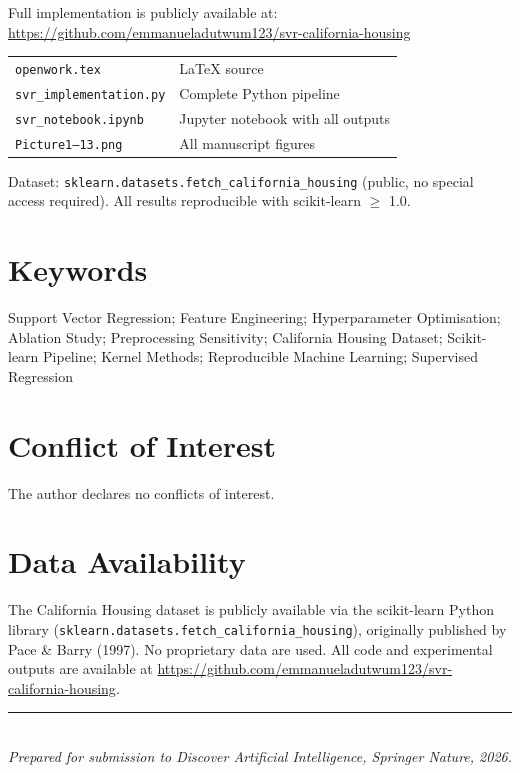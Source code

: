 \documentclass[12pt,a4paper]{article}
\begin{document}
Full implementation is publicly available at:\\[4pt]
\url{https://github.com/emmanueladutwum123/svr-california-housing}

\vspace{4pt}
\begin{tabular}{@{}ll@{}}
  \texttt{openwork.tex}          & LaTeX source \\
  \texttt{svr\_implementation.py}& Complete Python pipeline \\
  \texttt{svr\_notebook.ipynb}   & Jupyter notebook with all outputs \\
  \texttt{Picture1--13.png}      & All manuscript figures \\
\end{tabular}

\vspace{6pt}
Dataset: \texttt{sklearn.datasets.fetch\_california\_housing} (public, no special
access required). All results reproducible with scikit-learn $\geq$ 1.0.

\section{Keywords}

Support Vector Regression; Feature Engineering; Hyperparameter Optimisation;
Ablation Study; Preprocessing Sensitivity; California Housing Dataset;
Scikit-learn Pipeline; Kernel Methods; Reproducible Machine Learning;
Supervised Regression

\section{Conflict of Interest}

The author declares no conflicts of interest.

\section{Data Availability}

The California Housing dataset is publicly available via the scikit-learn Python
library (\texttt{sklearn.datasets.fetch\_california\_housing}), originally published
by Pace \& Barry (1997). No proprietary data are used. All code and experimental
outputs are available at
\url{https://github.com/emmanueladutwum123/svr-california-housing}.

\vspace{20pt}
\noindent\rule{\linewidth}{0.4pt}\\[4pt]
\small\textit{Prepared for submission to Discover Artificial Intelligence,
Springer Nature, 2026.}
\end{document}
